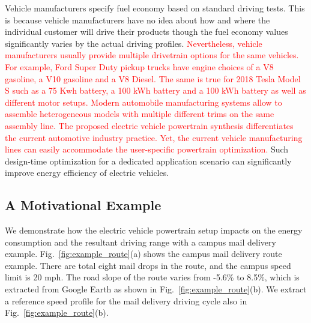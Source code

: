 \documentclass[journal]{IEEEtran}
\begin{document}
Vehicle manufacturers specify fuel economy based on standard driving tests. This is because vehicle manufacturers have no idea about how and where the individual customer will drive their products though the fuel economy values significantly varies by the actual driving profiles. \textcolor{red}{Nevertheless, vehicle manufacturers usually provide multiple drivetrain options for the same vehicles. For example, Ford Super Duty pickup trucks have engine choices of a V8 gasoline, a V10 gasoline and a V8 Diesel. The same is true for 2018 Tesla Model S such as a 75 Kwh battery, a 100 kWh battery and a 100 kWh battery as well as different motor setups. Modern automobile manufacturing systems allow to assemble heterogeneous models with multiple different trims on the same assembly line. The proposed electric vehicle powertrain synthesis differentiates the current automotive industry practice. Yet, the current vehicle manufacturing lines can easily accommodate the user-specific powertrain optimization.}
Such design-time optimization for a dedicated application scenario can significantly improve energy efficiency of electric vehicles. 


\subsection*{\textbf{A Motivational Example}}

We demonstrate how the electric vehicle powertrain setup impacts on the energy consumption and the resultant driving range with a campus mail delivery example. Fig.~\ref{fig:example_route}(a) shows the campus mail delivery route example. There are total eight mail drops in the route, and the campus speed limit is 20 mph. The road slope of the route varies from -5.6\% to 8.5\%, which is extracted from Google Earth as shown in Fig.~\ref{fig:example_route}(b). We extract a reference speed profile for the mail delivery driving cycle also in Fig.~\ref{fig:example_route}(b).
\end{document}
